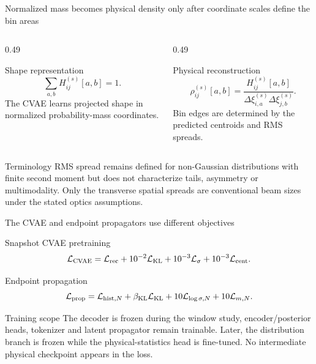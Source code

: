 \begin{frame}[t,shrink=5]{Normalized mass becomes physical density only after coordinate scales define the bin areas}
\begin{columns}[T,onlytextwidth]
\begin{column}{0.49\textwidth}
\begin{block}{Shape representation}
\[\sum_{a,b}H_{ij}^{(s)}[a,b]=1.\]The CVAE learns projected shape in normalized probability-mass coordinates.
\end{block}

\end{column}
\begin{column}{0.49\textwidth}
\begin{block}{Physical reconstruction}
\[\rho_{ij}^{(s)}[a,b]=\frac{H_{ij}^{(s)}[a,b]}{\Delta\xi_{i,a}^{(s)}\Delta\xi_{j,b}^{(s)}}.\]Bin edges are determined by the predicted centroids and RMS spreads.
\end{block}

\end{column}
\end{columns}
\begin{block}{Terminology}
RMS spread remains defined for non-Gaussian distributions with finite second moment but does not characterize tails, asymmetry or multimodality. Only the transverse spatial spreads are conventional beam sizes under the stated optics assumptions.
\end{block}

\end{frame}

\begin{frame}[t,shrink=5]{The CVAE and endpoint propagators use different objectives}
\begin{block}{Snapshot CVAE pretraining}
\[\mathcal L_{\rm CVAE}=\mathcal L_{\rm rec}+10^{-2}\mathcal L_{\rm KL}+10^{-3}\mathcal L_\sigma+10^{-3}\mathcal L_{\rm cent}.\]
\end{block}
\begin{block}{Endpoint propagation}
\[\mathcal L_{\rm prop}=\mathcal L_{{\rm hist},N}+\beta_{\rm KL}\mathcal L_{\rm KL}+10\mathcal L_{\log\sigma,N}+10\mathcal L_{m,N}.\]
\end{block}
\begin{block}{Training scope}
The decoder is frozen during the window study, encoder/posterior heads, tokenizer and latent propagator remain trainable. Later, the distribution branch is frozen while the physical-statistics head is fine-tuned. No intermediate physical checkpoint appears in the loss.
\end{block}


\end{frame}

